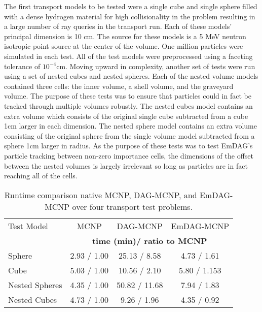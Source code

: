 The first transport models to be tested were a single cube and single sphere
filled with a dense hydrogen material for high collisionality in the problem
resulting in a large number of ray queries in the transport run. Each of these
models' principal dimension is 10 cm. The source for these models is a 5 MeV
neutron isotropic point source at the center of the volume. One million
particles were simulated in each test. All of the test models were preprocessed
using a faceting tolerance of $10^{-4}$cm. Moving upward in complexity, another
set of tests were run using a set of nested cubes and nested spheres. Each of
the nested volume models contained three cells: the inner volume, a shell
volume, and the graveyard volume. The purpose of these tests was to ensure that
particles could in fact be tracked through multiple volumes robustly. The nested
cubes model contains an extra volume which consists of the original single cube
subtracted from a cube 1cm larger in each dimension. The nested sphere model
contains an extra volume consisting of the original sphere from the single
volume model subtracted from a sphere 1cm larger in radius. As the purpose of
these tests was to test EmDAG's particle tracking between non-zero importance
cells, the dimensions of the offset between the nested volumes is largely
irrelevant so long as particles are in fact reaching all of the cells.

\begin{table}[H]
  \small
  \begin{center}

      \label{timings}
    \begin{tabular}{lccc}

      \toprule
      Test Model & MCNP & DAG-MCNP & EmDAG-MCNP \\
      & \multicolumn{3}{c}{\textbf{time (min)/ ratio to MCNP}} \\
      \hline
      Sphere & 2.93 / 1.00 & 25.13 / 8.58  & 4.73 / 1.61  \\
      Cube & 5.03 / 1.00 & 10.56 / 2.10 & 5.80 / 1.153 \\
      Nested Spheres & 4.35 / 1.00  & 50.82 / 11.68  & 7.94 / 1.83 \\
      Nested Cubes & 4.73 / 1.00 & 9.26 / 1.96 & 4.35 / 0.92 \\
      \bottomrule
      
    \end{tabular}
  \end{center}
  \caption{Runtime comparison native MCNP, DAG-MCNP, and EmDAG-MCNP over four
    transport test problems.}
  
\end{table}

